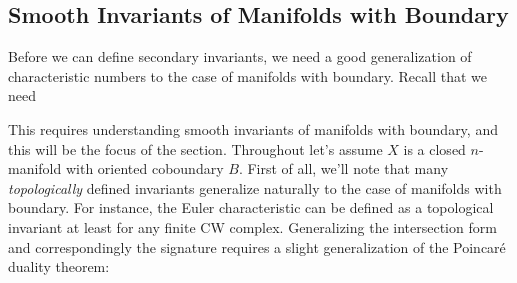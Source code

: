 \subsection{Smooth Invariants of Manifolds with Boundary}\label{sec:smooth-invariants-of-manifolds-with-boundary}

Before we can define secondary invariants, we need a good generalization of characteristic numbers to the case of manifolds with boundary. Recall that we need 




This requires understanding smooth invariants of manifolds with boundary, and this will be the focus of the section.
Throughout let's assume $X$ is a closed $n$-manifold with oriented coboundary $B$.
First of all, we'll note that many \emph{topologically} defined invariants generalize naturally to the case of manifolds with boundary. For instance, the Euler characteristic can be defined as a topological invariant at least for any finite CW complex.
Generalizing the intersection form and correspondingly the signature requires a slight generalization of the Poincar\'e duality theorem:

%
%


